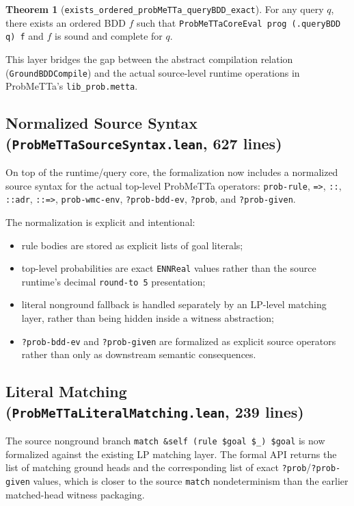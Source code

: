 \documentclass[11pt,a4paper]{article}
\theoremstyle{definition}
\newtheorem{theorem}{Theorem}[section]
\begin{document}
\begin{theorem}[\texttt{exists\_ordered\_probMeTTa\_queryBDD\_exact}]
For any query $q$, there exists an ordered BDD $f$ such that
\texttt{ProbMeTTaCoreEval prog (.queryBDD q) f} and $f$ is
sound and complete for $q$.
\end{theorem}

This layer bridges the gap between the abstract compilation relation
(\texttt{GroundBDDCompile}) and the actual source-level runtime operations
in ProbMeTTa's \texttt{lib\_prob.metta}.

\subsection{Normalized Source Syntax (\texttt{ProbMeTTaSourceSyntax.lean}, 627 lines)}

On top of the runtime/query core, the formalization now includes a normalized
source syntax for the actual top-level ProbMeTTa operators:
\texttt{prob-rule}, \texttt{=>}, \texttt{::}, \texttt{::adr}, \texttt{::=>},
\texttt{prob-wmc-env}, \texttt{?prob-bdd-ev}, \texttt{?prob}, and
\texttt{?prob-given}.

The normalization is explicit and intentional:
\begin{itemize}
\item rule bodies are stored as explicit lists of goal literals;
\item top-level probabilities are exact \texttt{ENNReal} values rather than
  the source runtime's decimal \texttt{round-to 5} presentation;
\item literal nonground fallback is handled separately by an LP-level matching
  layer, rather than being hidden inside a witness abstraction;
\item \texttt{?prob-bdd-ev} and \texttt{?prob-given} are formalized as explicit
  source operators rather than only as downstream semantic consequences.
\end{itemize}

\subsection{Literal Matching (\texttt{ProbMeTTaLiteralMatching.lean}, 239 lines)}

The source nonground branch
\verb|match &self (rule $goal $_) $goal|
is now formalized against the existing LP matching layer. The formal API
returns the list of matching ground heads and the corresponding list of exact
\texttt{?prob}/\texttt{?prob-given} values, which is closer to the source
\texttt{match} nondeterminism than the earlier matched-head witness packaging.
\end{document}
